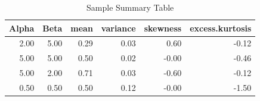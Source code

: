 \documentclass{article}\usepackage[]{graphicx}\usepackage[]{xcolor}
\begin{document}
\begin{table}[H]
\centering
\begingroup\small
\begin{tabular}{rrrrrr}
  \hline
Alpha & Beta & mean & variance & skewness & excess.kurtosis \\ 
  \hline
2.00 & 5.00 & 0.29 & 0.03 & 0.60 & -0.12 \\ 
  5.00 & 5.00 & 0.50 & 0.02 & -0.00 & -0.46 \\ 
  5.00 & 2.00 & 0.71 & 0.03 & -0.60 & -0.12 \\ 
  0.50 & 0.50 & 0.50 & 0.12 & -0.00 & -1.50 \\ 
   \hline
\end{tabular}
\endgroup
\caption{Sample Summary Table} 
\label{Table 3}
\end{table}
\end{document}
